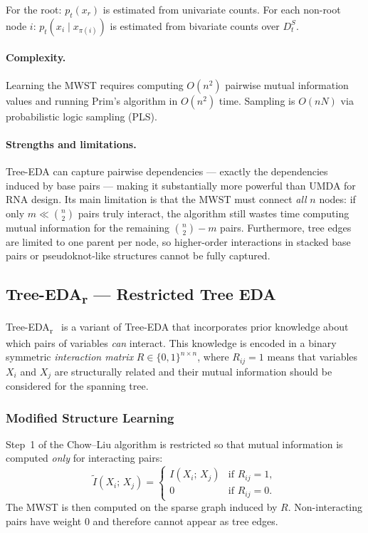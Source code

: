 \documentclass[11pt,a4paper]{article}
\begin{document}
For the root: $p_t(x_r)$ is estimated from univariate counts. For each
non-root node $i$: $p_t(x_i \mid x_{\pi(i)})$ is estimated from bivariate
counts over $D_t^S$.

\paragraph{Complexity.} Learning the MWST requires computing $O(n^2)$
pairwise mutual information values and running Prim's algorithm in
$O(n^2)$ time. Sampling is $O(nN)$ via probabilistic logic sampling (PLS).

\paragraph{Strengths and limitations.} Tree-EDA can capture pairwise
dependencies — exactly the dependencies induced by base pairs — making it
substantially more powerful than UMDA for RNA design. Its main limitation
is that the MWST must connect \emph{all} $n$ nodes: if only $m \ll
\binom{n}{2}$ pairs truly interact, the algorithm still wastes time
computing mutual information for the remaining $\binom{n}{2} - m$ pairs.
Furthermore, tree edges are limited to one parent per node, so higher-order
interactions in stacked base pairs or pseudoknot-like structures cannot be
fully captured.

\subsection{Tree-EDA\textsubscript{r} — Restricted Tree EDA}

Tree-EDA\textsubscript{r}~\cite{santana2012transfer} is a variant of
Tree-EDA that incorporates prior knowledge about which pairs of variables
\emph{can} interact. This knowledge is encoded in a binary symmetric
\emph{interaction matrix} $R \in \{0,1\}^{n \times n}$, where $R_{ij} = 1$
means that variables $X_i$ and $X_j$ are structurally related and their
mutual information should be considered for the spanning tree.

\subsubsection*{Modified Structure Learning}

Step~1 of the Chow--Liu algorithm is restricted so that mutual information
is computed \emph{only} for interacting pairs:
\[
  \tilde{I}(X_i;\, X_j) =
  \begin{cases}
    I(X_i;\, X_j) & \text{if } R_{ij} = 1,\\
    0              & \text{if } R_{ij} = 0.
  \end{cases}
\]
The MWST is then computed on the sparse graph induced by $R$. Non-interacting
pairs have weight 0 and therefore cannot appear as tree edges.
\end{document}
